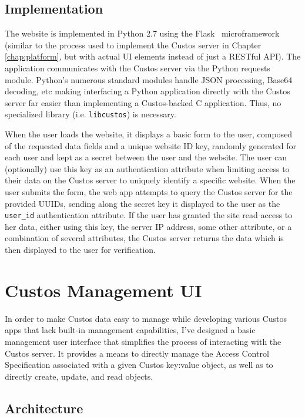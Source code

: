 \subsection{Implementation}

The website is implemented in Python 2.7 using the
Flask~\cite{python-flask} microframework (similar to the process used
to implement the Custos server in Chapter \ref{chap:platform}, but
with actual UI elements instead of just a RESTful API). The
application communicates with the Custos server via the Python
requests~\cite{python-requests} module. Python's numerous standard
modules handle JSON processing, Base64 decoding, etc making
interfacing a Python application directly with the Custos server far
easier than implementing a Custos-backed C application. Thus, no
specialized library (i.e. \texttt{libcustos}) is necessary.

When the user loads the website, it displays a basic form to the user,
composed of the requested data fields and a unique website ID key,
randomly generated for each user and kept as a secret between the user
and the website. The user can (optionally) use this key as an
authentication attribute when limiting access to their data on the
Custos server to uniquely identify a specific website. When the user
submits the form, the web app attempts to query the Custos server for
the provided UUIDs, sending along the secret key it displayed to the
user as the \texttt{user\_id} authentication attribute. If the user
has granted the site read access to her data, either using this key,
the server IP address, some other attribute, or a combination of
several attributes, the Custos server returns the data which is then
displayed to the user for verification.

\section{Custos Management UI}

In order to make Custos data easy to manage while developing various
Custos apps that lack built-in management capabilities, I've designed
a basic management user interface that simplifies the process of
interacting with the Custos server. It provides a means to directly
manage the Access Control Specification associated with a given Custos
key:value object, as well as to directly create, update, and read
objects.

\subsection{Architecture}

